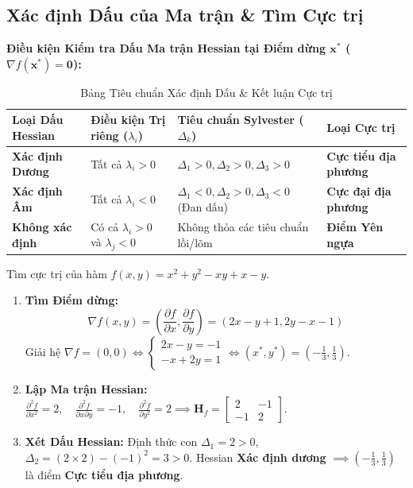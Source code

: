 \documentclass[11pt,a4paper]{article}
\begin{document}
\subsection{Xác định Dấu của Ma trận \& Tìm Cực trị}
\textbf{Điều kiện Kiểm tra Dấu Ma trận Hessian tại Điểm dừng $\mathbf{x}^*$ ($\nabla f(\mathbf{x}^*) = \mathbf{0}$):}

\begin{table}[h]
\centering
\caption{Bảng Tiêu chuẩn Xác định Dấu \& Kết luận Cực trị}
\begin{tabular}{p{3.5cm}p{4cm}p{4cm}p{3.5cm}}
\toprule
\textbf{Loại Dấu Hessian} & \textbf{Điều kiện Trị riêng ($\lambda_i$)} & \textbf{Tiêu chuẩn Sylvester ($\Delta_k$)} & \textbf{Loại Cực trị} \\
\midrule
\textbf{Xác định Dương} & Tất cả $\lambda_i > 0$ & $\Delta_1 > 0, \Delta_2 > 0, \Delta_3 > 0$ & \textbf{Cực tiểu địa phương} \\
\textbf{Xác định Âm} & Tất cả $\lambda_i < 0$ & $\Delta_1 < 0, \Delta_2 > 0, \Delta_3 < 0$ (Đan dấu) & \textbf{Cực đại địa phương} \\
\textbf{Không xác định} & Có cả $\lambda_i > 0$ và $\lambda_j < 0$ & Không thỏa các tiêu chuẩn lồi/lõm & \textbf{Điểm Yên ngựa} \\
\bottomrule
\end{tabular}
\end{table}

\begin{examplebox}
Tìm cực trị của hàm $f(x, y) = x^2 + y^2 - xy + x - y$.
\begin{enumerate}
    \item \textbf{Tìm Điểm dừng:} 
    $$\nabla f(x, y) = \left( \frac{\partial f}{\partial x}, \frac{\partial f}{\partial y} \right) = (2x - y + 1, 2y - x - 1)$$
    Giải hệ $\nabla f = (0, 0) \iff \begin{cases} 2x - y = -1 \\ -x + 2y = 1 \end{cases} \iff (x^*, y^*) = \left(-\frac{1}{3}, \frac{1}{3}\right)$.
    
    \item \textbf{Lập Ma trận Hessian:}
    $\frac{\partial^2 f}{\partial x^2} = 2, \quad \frac{\partial^2 f}{\partial x \partial y} = -1, \quad \frac{\partial^2 f}{\partial y^2} = 2 \implies \mathbf{H}_f = \begin{bmatrix} 2 & -1 \\ -1 & 2 \end{bmatrix}$.
    
    \item \textbf{Xét Dấu Hessian:}
    Định thức con $\Delta_1 = 2 > 0$, $\Delta_2 = (2 \times 2) - (-1)^2 = 3 > 0$.
    Hessian \textbf{Xác định dương} $\implies \left(-\frac{1}{3}, \frac{1}{3}\right)$ là điểm \textbf{Cực tiểu địa phương}.
\end{enumerate}
\end{examplebox}
\end{document}
